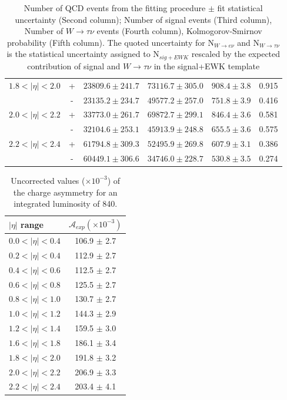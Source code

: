 \begin{table}[htbp]
\begin{center}
\begin{tabular}{lcrrrr}
$1.8<| \eta |<2.0$ &  +& $23809.6 \pm 241.7$ &$73116.7\pm305.0$&$ 908.4\pm3.8 $&0.915 \\
                   &  -& $23135.2 \pm 234.7$ &$49577.2\pm257.0$&$ 751.8\pm3.9 $&0.416 \\ 
$2.0<| \eta |<2.2$ &  +& $33773.0 \pm 261.7$ &$69872.7\pm299.1$&$ 846.4\pm3.6 $&0.581 \\
                   &  -& $32104.6 \pm 253.1$ &$45913.9\pm248.8$&$ 655.5\pm3.6 $&0.575 \\ 
$2.2<| \eta |<2.4$ &  +& $61794.8 \pm 309.3$ &$52495.9\pm269.8$&$ 607.9\pm3.1 $&0.386 \\
                   &  -& $60449.1 \pm 306.6$ &$34746.0\pm228.7$&$ 530.8\pm3.5 $&0.274 \\ 
 \end{tabular}
 \caption{\label{tab:chi2}
 Number of QCD events from the fitting procedure $\pm$ fit statistical uncertainty (Second column);
   Number of signal events  (Third column), Number of $W\rightarrow \tau \nu$ events (Fourth column),
 Kolmogorov-Smirnov probability (Fifth column).
 The quoted uncertainty for N$_{W\rightarrow e \nu}$ and N$_{W\rightarrow \tau \nu}$
 is the statistical uncertainty assigned to N$_{sig+EWK}$
 rescaled by the expected contribution of signal and $W\rightarrow \tau \nu$ in the signal+EWK template}
 \end{center}
\end{table}

\begin{table}[htbp]
  \begin{center}
    \begin{tabular}{lc}
    $|\eta|$ range & $\mathcal{A}_{exp} (\times 10^{-3})$\\
    \hline
    $0.0<|\eta|<0.4$ & 106.9 $\pm$ 2.7\\
    $0.2<|\eta|<0.4$ & 112.9 $\pm$ 2.7\\
    $0.4<|\eta|<0.6$ & 112.5 $\pm$ 2.7\\
    $0.6<|\eta|<0.8$ & 125.5 $\pm$ 2.7\\
    $0.8<|\eta|<1.0$ & 130.7 $\pm$ 2.7\\
    $1.0<|\eta|<1.2$ & 144.3 $\pm$ 2.9\\
    $1.2<|\eta|<1.4$ & 159.5 $\pm$ 3.0 \\
    $1.6<|\eta|<1.8$ & 186.1 $\pm$ 3.4\\
    $1.8<|\eta|<2.0$ & 191.8 $\pm$ 3.2\\
    $2.0<|\eta|<2.2$ & 206.9 $\pm$ 3.3\\
    $2.2<|\eta|<2.4$ & 203.4 $\pm$ 4.1\\
    \end{tabular}
  \caption{\label{tab:uncorRes}Uncorrected values ($\times 10^{-3}$) of the
  charge asymmetry  for an integrated luminosity of \unit{840}{\invpb}. }
  \end{center}
\end{table}

